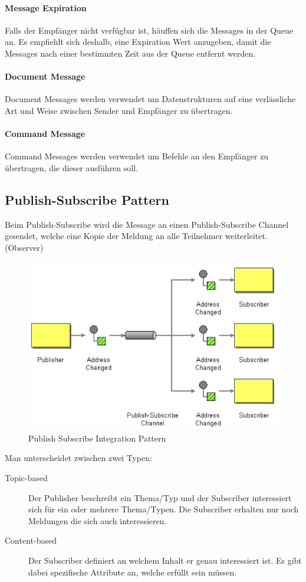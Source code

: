 \paragraph{Message Expiration}
Falls der Empfänger nicht verfügbar ist, häuffen sich die Messages in der Queue an. Es empfiehlt sich deshalb, eine Expiration Wert anzugeben, damit die Messages nach einer bestimmten Zeit aus der Queue entfernt werden.

\paragraph{Document Message}
Document Messages werden verwendet um Datenstrukturen auf eine verlässliche Art und Weise zwischen Sender und Empfänger zu übertragen.

\paragraph{Command Message}
Command Messages werden verwendet um Befehle an den Empfänger zu übertragen, die dieser ausführen soll.

\clearpage

\subsection{Publish-Subscribe Pattern}
Beim Publish-Subscribe wird die Message an einen Publish-Subscribe Channel gesendet, welche eine Kopie der Meldung an alle Teilnehmer weiterleitet. (Observer)
\begin{figure}[h!]
	\centering
	\includegraphics[width=0.7\linewidth]{img/publish_subscribe_messaging_pattern1}
	\caption{Publish Subscribe Integration Pattern}
	\label{fig:publishsubscribemessagingpattern1}
\end{figure}

Man unterscheidet zwischen zwei Typen:
\begin{description}
	\item[Topic-based] Der Publisher beschreibt ein Thema/Typ und der Subscriber interessiert sich für ein oder mehrere Thema/Typen. Die Subscriber erhalten nur noch Meldungen die sich auch interessieren.
	\item[Content-based] Der Subscriber definiert an welchem Inhalt er genau interessiert ist. Es gibt dabei spezifische Attribute an, welche erfüllt sein müssen.
\end{description}



